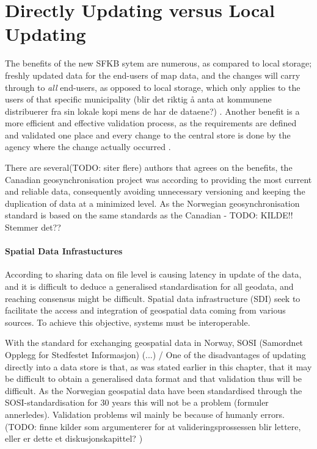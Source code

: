 \chapter{Directly Updating versus Local Updating}
The benefits of the new SFKB sytem are numerous, as compared to local storage; freshly updated data for the end-users of map data, and the changes will carry through to \textit{all} end-users, as opposed to local storage, which only applies to the users of that specific municipality (blir det riktig å anta at kommunene distribuerer fra sin lokale kopi mens de har de dataene?) \citep{Dontigney2017}. Another benefit is a more efficient and effective validation process, as the requirements are defined and validated one place and every change to the central store is done by the agency where the change actually occurred \citep{Kartverket2017e}. 

There are several(TODO: siter flere) authors that agrees on the benefits, the Canadian geosynchronisation project was according to \cite{Reichardt2012} providing the most current and reliable data, consequently avoiding unnecessary versioning and keeping the duplication of data at a minimized level. As the Norwegian geosynchronisation standard is based on the same standards as the Canadian - \cite[p.~7]{Kartverket2013}  TODO: KILDE!! Stemmer det??



\subsubsection{Spatial Data Infrastuctures}

According to \cite{Peng2005} sharing data on file level is causing latency in update of the data, and it is difficult to deduce a generalised standardisation for all geodata, and reaching consensus might be difficult.  Spatial data infrastructure (SDI) seek to facilitate the access and integration of geospatial data coming from various sources. To achieve this objective, systems must be interoperable. \cite{giuliani2013} 

With the standard for exchanging geospatial data in Norway, SOSI (Samordnet Opplegg for Stedfestet Informasjon) (...) /   
One of the disadvantages of updating directly into a data store is that, as was stated earlier in this chapter, that it may be difficult to obtain a generalised data format and that validation thus will be difficult. As the Norwegian geospatial data have been standardised through the SOSI-standardisation for 30 years this will not be a problem (formuler annerledes). Validation problems wil mainly be because of humanly errors.    (TODO: finne kilder som argumenterer for at valideringsprossessen blir lettere, eller er dette et diskusjonskapittel? ) 

